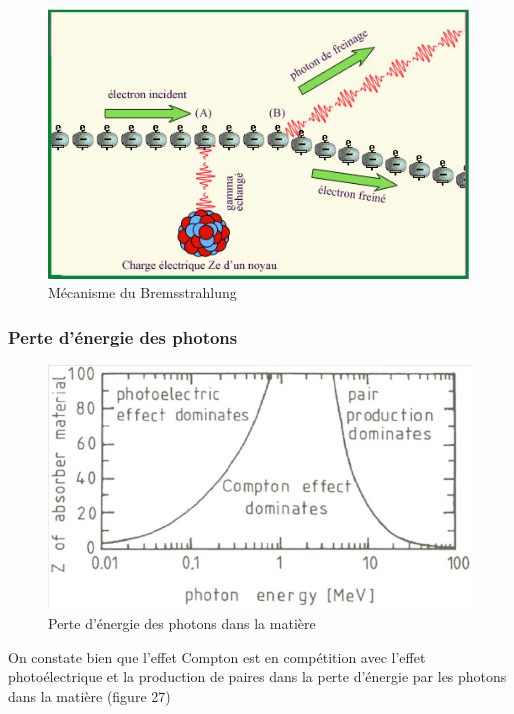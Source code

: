     \begin{figure}[ht]
        \centering
        \includegraphics[scale=0.60]{Images1/Bremsstrahlung3.PNG}
        \caption{Mécanisme du Bremsstrahlung}
    \end{figure}
    
    \subsubsection{Perte d'énergie des photons}
    
    \begin{figure}[ht]
        \centering
        \includegraphics[scale=0.60]{Images1/pertephotons.PNG}
        \caption{Perte d'énergie des photons dans la matière}
    \end{figure}
On constate bien que l'effet Compton est en compétition avec l'effet photoélectrique et la production de paires dans la perte d'énergie par les photons dans la matière (figure 27)\\
    
